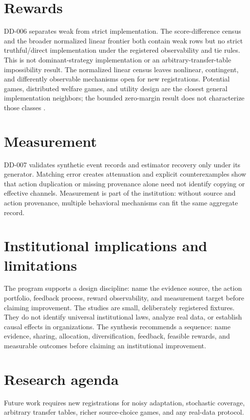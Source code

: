 \documentclass[11pt]{article}
\begin{document}
\section{Rewards}
DD-006 separates weak from strict implementation. The score-difference census
and the broader normalized linear frontier both contain weak rows but no strict
truthful/direct implementation under the registered observability and tie rules.
This is not dominant-strategy implementation or an arbitrary-transfer-table
impossibility result.
The normalized linear census leaves nonlinear, contingent, and differently
observable mechanisms open for new registrations.
Potential games, distributed welfare games, and utility design are the closest
general implementation neighbors; the bounded zero-margin result does not
characterize those classes
\citep{MondererShapley1996,MardenWierman2013,PaccagnanChandanMarden2020}.
\section{Measurement}
DD-007 validates synthetic event records and estimator recovery only under its
generator. Matching error creates attenuation and explicit counterexamples show
that action duplication or missing provenance alone need not identify copying or
effective channels.
Measurement is part of the institution: without source and action provenance,
multiple behavioral mechanisms can fit the same aggregate record.
\section{Institutional implications and limitations}
The program supports a design discipline: name the evidence source, the action
portfolio, feedback process, reward observability, and measurement target before
claiming improvement. The studies are small, deliberately registered fixtures.
They do not identify universal institutional laws, analyze real data, or establish
causal effects in organizations.
The synthesis recommends a sequence: name evidence, sharing, allocation,
diversification, feedback, feasible rewards, and measurable outcomes before
claiming an institutional improvement.
\section{Research agenda}
Future work requires new registrations for noisy adaptation, stochastic coverage,
arbitrary transfer tables, richer source-choice games, and any real-data protocol.

\end{document}
